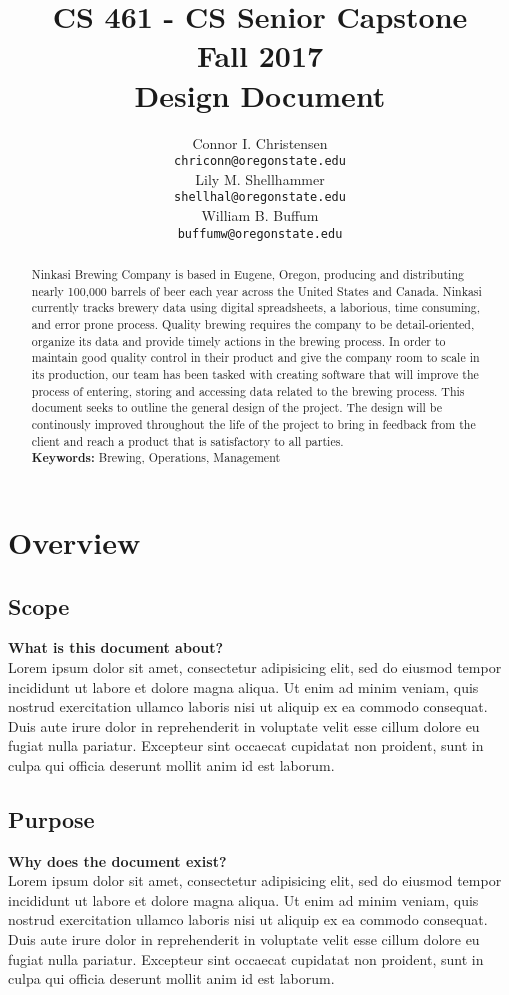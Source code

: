 \documentclass[draftclsnofoot,onecolumn,letterpaper,10pt]{IEEEtran}
\title{CS 461 - CS Senior Capstone
	\\Fall 2017
	\\Design Document
}
\author{
	Connor I. Christensen \\
	\texttt{chriconn@oregonstate.edu}
	\\
	Lily M. Shellhammer \\
	\texttt{shellhal@oregonstate.edu}
	\\
	William B. Buffum \\
	\texttt{buffumw@oregonstate.edu}
}
\begin{document}
\begin{titlingpage}
    \maketitle
    \begin{abstract}
			Ninkasi Brewing Company is based in Eugene, Oregon, producing and distributing nearly 100,000 barrels of beer each year across the United States and Canada.
			Ninkasi currently tracks brewery data using digital spreadsheets, a laborious, time consuming, and error prone process.
			Quality brewing requires the company to be detail-oriented, organize its data and provide timely actions in the brewing process.
			In order to maintain good quality control in their product and give the company room to scale in its production, our team has been tasked with creating software that will improve the process of entering, storing and accessing data related to the brewing process.
			This document seeks to outline the general design of the project.
			The design will be continously improved throughout the life of the project to bring in feedback from the client and reach a product that is satisfactory to all parties.
			\\
			\textbf{Keywords:} Brewing, Operations, Management
    \end{abstract}
\end{titlingpage}

\section{Overview}
	\subsection{Scope}
	\textbf{What is this document about?}\\
	Lorem ipsum dolor sit amet, consectetur adipisicing elit, sed do eiusmod tempor incididunt ut labore et dolore magna aliqua. Ut enim ad minim veniam, quis nostrud exercitation ullamco laboris nisi ut aliquip ex ea commodo consequat. Duis aute irure dolor in reprehenderit in voluptate velit esse cillum dolore eu fugiat nulla pariatur. Excepteur sint occaecat cupidatat non proident, sunt in culpa qui officia deserunt mollit anim id est laborum.
	\subsection{Purpose}
	\textbf{Why does the document exist?}\\
	Lorem ipsum dolor sit amet, consectetur adipisicing elit, sed do eiusmod tempor incididunt ut labore et dolore magna aliqua. Ut enim ad minim veniam, quis nostrud exercitation ullamco laboris nisi ut aliquip ex ea commodo consequat. Duis aute irure dolor in reprehenderit in voluptate velit esse cillum dolore eu fugiat nulla pariatur. Excepteur sint occaecat cupidatat non proident, sunt in culpa qui officia deserunt mollit anim id est laborum.
\end{document}
